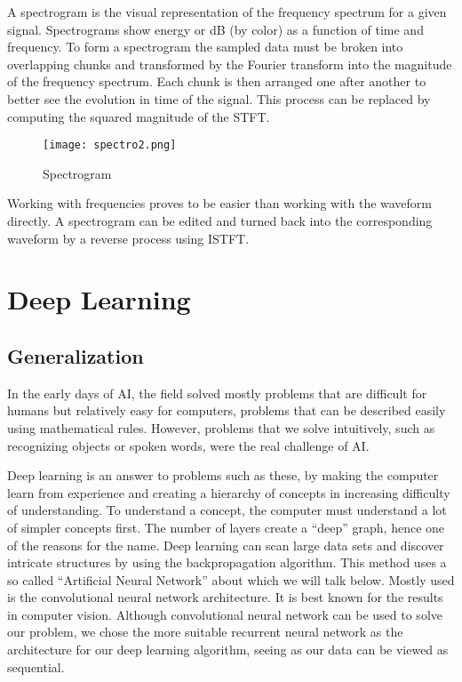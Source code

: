 \documentclass[../Thesis.tex]{subfiles}
\begin{document}
A spectrogram is the visual representation of the frequency spectrum for a given signal. Spectrograms show energy or dB (by color) as a function of time and frequency. To form a spectrogram the sampled data must be broken into overlapping chunks and transformed by the Fourier transform into the magnitude of the frequency spectrum. Each chunk is then arranged one after another to better see the evolution in time of the signal. This process can be replaced by computing the squared magnitude of the STFT.

\begin{figure}[h]
\centering
\label {fig: spectrogram}
\texttt{[image: spectro2.png]}
\caption[width=0.5\textwidth]{Spectrogram}
\end{figure}

Working with frequencies proves to be easier than working with the waveform directly. A spectrogram can be edited and turned back into the corresponding waveform by a reverse process using ISTFT. 


\section {Deep Learning}
\subsection {Generalization}

In the early days of AI, the field solved mostly problems that are difficult for humans but relatively easy for computers, problems that can be described easily using mathematical rules. However, problems that we solve intuitively, such as recognizing objects or spoken words, were the real challenge of AI.

Deep learning is an answer to problems such as these, by making the computer learn from experience and creating a hierarchy of concepts in increasing difficulty of understanding. To understand a concept, the computer must understand a lot of simpler concepts first. The number of layers create a “deep” graph, hence one of the reasons for the name. Deep learning can scan large data sets and discover intricate structures by using the backpropagation algorithm. This method uses a so called “Artificial Neural Network” about which we will talk below. Mostly used is the convolutional neural network architecture. It is best known for the results in computer vision. Although convolutional neural network can be used to solve our problem, we chose the more suitable recurrent neural network as the architecture for our deep learning algorithm, seeing as our data can be viewed as sequential.
\end{document}
